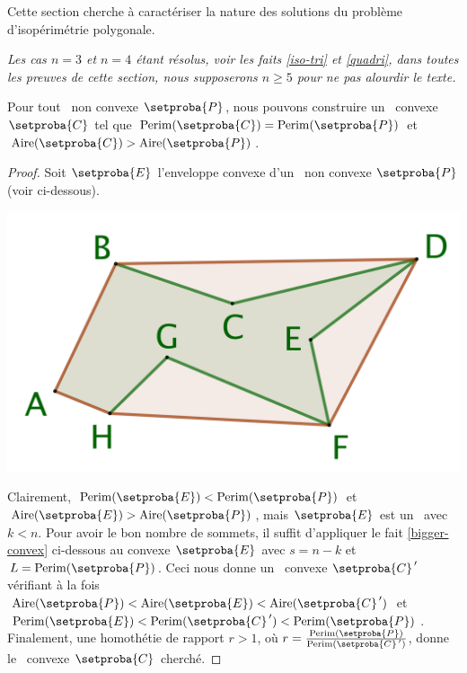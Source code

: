 Cette section cherche à caractériser la nature des solutions du problème d’isopérimétrie polygonale.

\begin{tcolorbox}
	\itshape\small
	Les cas $n = 3$ et $n = 4$ étant résolus, voir les faits \ref{iso-tri} et \ref{quadri}, dans toutes les preuves de cette section, nous supposerons $n \geq 5$ pour ne pas alourdir le texte.
\end{tcolorbox}




\begin{fact} \label{must-be-conv}
    Pour tout \ngone\ non convexe $\setproba{P}$,
	nous pouvons construire un \ngone\ convexe $\setproba{C}$ tel que
	$\perim{\setproba{C}} = \perim{\setproba{P}}$
	et
	$\area{\setproba{C}} > \area{\setproba{P}}$.
\end{fact}


\begin{proof}
	Soit $\setproba{E}$ l'enveloppe convexe d'un \ngone\ non convexe $\setproba{P}$ (voir ci-dessous).
	
	\begin{center}
		\centering
		\small\itshape
		\includegraphics[scale=.45]{content/polygon/sol-must-be/convex-hull.png}
	\end{center}
	
	Clairement,
	$\perim{\setproba{E}} < \perim{\setproba{P}}$
	et
	$\area{\setproba{E}} > \area{\setproba{P}}$,
	mais
	$\setproba{E}$ est un \kgone\ avec $k < n$. 
	Pour avoir le bon nombre de sommets, il suffit d'appliquer le fait \ref{bigger-convex} ci-dessous au convexe $\setproba{E}$ avec $s = n - k$ et $L = \perim{\setproba{P}}$.
	Ceci nous donne un \ngone\ convexe $\primeit{\setproba{C}}$ vérifiant à la fois
	$\area{\setproba{P}} < \area{\setproba{E}} < \area{\primeit{\setproba{C}}}$
	et
	$\perim{\setproba{E}} < \perim{\primeit{\setproba{C}}} < \perim{\setproba{P}}$.
	Finalement, une homothétie de rapport $r > 1$, où $r = \frac{ \perim{\setproba{P}} }{ \perim{\primeit{\setproba{C}}} }$, donne le \ngone\ convexe $\setproba{C}$ cherché.
	
	\null\vspace{-5ex}
\end{proof}


